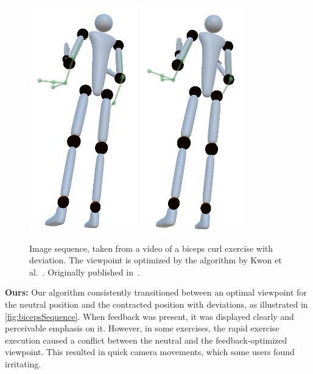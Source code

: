 \begin{figure}[h!]
	\includegraphics[width=0.12\linewidth]{pictures/kwonSequence7.png}\hfill
	\includegraphics[width=0.115\linewidth]{pictures/kwonSequence8.png}\hfill
	\caption{Image sequence, taken from a video of a biceps curl exercise with deviation. The viewpoint is optimized by the algorithm by Kwon et al.~\cite{kwon2020ocp}. Originally published in~\cite{diller2024automatic}.}
	\label{fig:kwonSequence}
\end{figure}

\textbf{Ours:}
Our algorithm consistently transitioned between an optimal viewpoint for the neutral position and the contracted position with deviations, as illustrated in \autoref{fig:bicepsSequence}. When feedback was present, it was displayed clearly and perceivable emphasis on it. However, in some exercises, the rapid exercise execution caused a conflict between the neutral and the feedback-optimized viewpoint. This resulted in quick camera movements, which some users found irritating.

